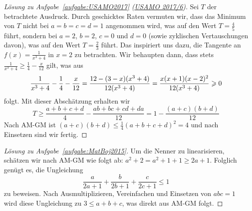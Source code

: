 \begin{proof}[Lösung zu Aufgabe~\ref{aufgabe:USAMO2017} \textmd{(\href{https://artofproblemsolving.com/community/c439884_2017_usamo}{USAMO 2017/6})}]
	Sei $T$ der betrachtete Ausdruck. Durch geschicktes Raten vermuten wir, dass das Minimum von $T$ nicht bei $a=b=c=d=1$ angenommen wird, was auf den Wert $T=\frac45$ führt, sondern bei $a=2$, $b=2$, $c=0$ und $d=0$ (sowie zyklischen Vertauschungen davon), was auf den Wert $T=\frac23$ führt. Das inspiriert uns dazu, die Tangente an $f(x)=\frac{1}{x^3+4}$ in $x=2$ zu betrachten. Wir behaupten dann, dass stets $ \frac{1}{x^3+4}\geqslant \frac14-\frac{x}{12}$ gilt, was aus
	\begin{equation*}
		\frac1{x^3+4}-\frac14-\frac{x}{12}=\frac {12-(3-x)(x^3+4)}{12(x^3+4)}=\frac{x(x+1)(x-2)^2}{12\parens*{x^3+4}}\geqslant 0
	\end{equation*}
	folgt. Mit dieser Abschätzung erhalten wir
	\begin{equation*}
		T\geqslant \frac{a+b+c+d}4-\frac{ab+bc+cd+da}{12}=1-\frac{(a+c)(b+d)}{12}
	\end{equation*}
	Nach AM-GM ist $(a+c)(b+d)\leqslant \frac14(a+b+c+d)^2=4$ und nach Einsetzen sind wir fertig.
\end{proof}
\begin{proof}[Lösung zu Aufgabe~\ref{aufgabe:MatBoj2015}]
	Um die Nenner zu linearisieren, schätzen wir nach AM-GM wie folgt ab: $a^2+2=a^2+1+1\geqslant 2a+1$. Folglich genügt es, die Ungleichung
	\begin{equation*}
		\frac{a}{2a+1}+\frac{b}{2b+1}+\frac{c}{2c+1}\leqslant 1
	\end{equation*}
	zu beweisen. Nach Ausmultiplizieren, Vereinfachen und Einsetzen von $abc=1$ wird diese Ungleichung zu $3\leqslant a+b+c$, was direkt aus AM-GM folgt.
\end{proof}
